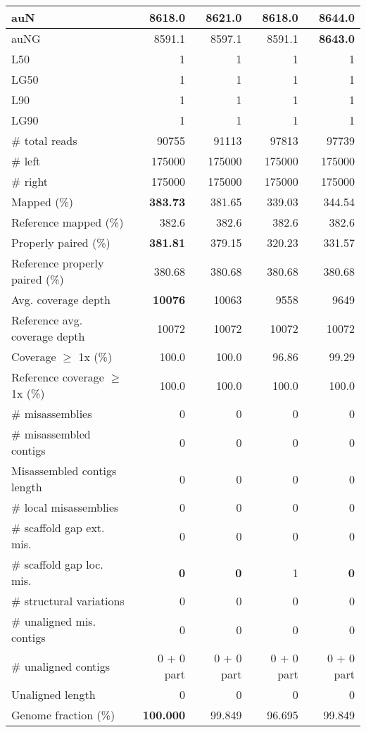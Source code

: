\documentclass[12pt,a4paper]{article}
\begin{document}
\begin{table}[ht]
\begin{center}
\begin{tabular}{|l*{4}{|r}|}
auN & 8618.0 & 8621.0 & 8618.0 & {\bf 8644.0} \\ \hline
auNG & 8591.1 & 8597.1 & 8591.1 & {\bf 8643.0} \\ \hline
L50 & 1 & 1 & 1 & 1 \\ \hline
LG50 & 1 & 1 & 1 & 1 \\ \hline
L90 & 1 & 1 & 1 & 1 \\ \hline
LG90 & 1 & 1 & 1 & 1 \\ \hline
\# total reads & 90755 & 91113 & 97813 & 97739 \\ \hline
\# left & 175000 & 175000 & 175000 & 175000 \\ \hline
\# right & 175000 & 175000 & 175000 & 175000 \\ \hline
Mapped (\%) & {\bf 383.73} & 381.65 & 339.03 & 344.54 \\ \hline
Reference mapped (\%) & 382.6 & 382.6 & 382.6 & 382.6 \\ \hline
Properly paired (\%) & {\bf 381.81} & 379.15 & 320.23 & 331.57 \\ \hline
Reference properly paired (\%) & 380.68 & 380.68 & 380.68 & 380.68 \\ \hline
Avg. coverage depth & {\bf 10076} & 10063 & 9558 & 9649 \\ \hline
Reference avg. coverage depth & 10072 & 10072 & 10072 & 10072 \\ \hline
Coverage $\geq$ 1x (\%) & 100.0 & 100.0 & 96.86 & 99.29 \\ \hline
Reference coverage $\geq$ 1x (\%) & 100.0 & 100.0 & 100.0 & 100.0 \\ \hline
\# misassemblies & 0 & 0 & 0 & 0 \\ \hline
\# misassembled contigs & 0 & 0 & 0 & 0 \\ \hline
Misassembled contigs length & 0 & 0 & 0 & 0 \\ \hline
\# local misassemblies & 0 & 0 & 0 & 0 \\ \hline
\# scaffold gap ext. mis. & 0 & 0 & 0 & 0 \\ \hline
\# scaffold gap loc. mis. & {\bf 0} & {\bf 0} & 1 & {\bf 0} \\ \hline
\# structural variations & 0 & 0 & 0 & 0 \\ \hline
\# unaligned mis. contigs & 0 & 0 & 0 & 0 \\ \hline
\# unaligned contigs & 0 + 0 part & 0 + 0 part & 0 + 0 part & 0 + 0 part \\ \hline
Unaligned length & 0 & 0 & 0 & 0 \\ \hline
Genome fraction (\%) & {\bf 100.000} & 99.849 & 96.695 & 99.849 \\ \hline

\end{tabular}
\end{center}
\end{table}
\end{document}
